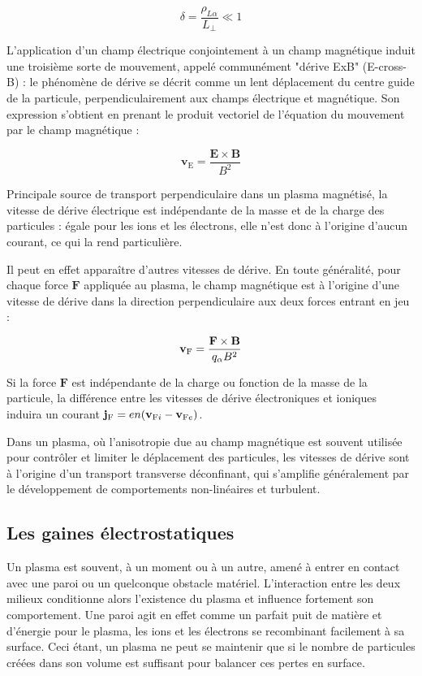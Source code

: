 \begin{refsection}
\begin{equation}
\delta=\frac{\rho_{L\alpha}}{L_\perp}\ll 1
\end{equation}

L'application d'un champ électrique conjointement à un champ magnétique
induit une troisième sorte de mouvement, appelé communément "dérive
ExB" (E-cross-B) : le phénomène de dérive se décrit comme un lent déplacement du
centre guide de la particule, perpendiculairement aux champs électrique et
magnétique. Son expression s'obtient en
prenant le produit vectoriel de l'équation du mouvement par le champ magnétique
:

\begin{equation}
\mathbf{v}_\text{E}=\frac{\mathbf{E}\times\mathbf{B}}{B^2}
\end{equation}

Principale source de transport perpendiculaire
dans un plasma magnétisé, la vitesse de dérive électrique est indépendante de
la masse et de la charge des particules : égale pour les ions et les électrons, elle n'est donc à
l'origine d'aucun courant, ce qui la rend particulière. 

Il peut en effet apparaître d'autres vitesses de dérive. En toute généralité, 
pour chaque force $\mathbf F$ appliquée au plasma, le champ magnétique est à
l'origine d'une vitesse de dérive dans la direction perpendiculaire aux deux
forces entrant en jeu :

\begin{equation}
\mathbf{v}{_{\text{F}}}=\frac{\mathbf{F}\times\mathbf{B}}{q_\alpha B^2}
\end{equation}

Si la force $\mathbf F$ est indépendante de la charge ou
fonction de la masse de la particule, la différence entre les vitesses de dérive
électroniques et ioniques induira un courant $\mathbf
j{_{\text{F}}}=en(\mathbf v{_{\text{F}{i}}}-\mathbf
v{_{\text{F}{e}}})$. 

Dans un plasma, où l'anisotropie due au champ
magnétique est souvent utilisée pour contrôler et limiter le déplacement des
particules, les vitesses de dérive sont à l'origine d'un transport
 transverse déconfinant, qui s'amplifie généralement par le développement de
 comportements non-linéaires et turbulent.
 
\subsection{Les gaines électrostatiques}
\label{1-gaines}
Un plasma est souvent, à un moment ou à un autre, amené à entrer en contact avec
une paroi ou un quelconque obstacle matériel. L'interaction entre
les deux milieux conditionne alors l'existence du plasma et influence
fortement son comportement. Une paroi agit en effet comme un parfait
puit de matière et d'énergie pour le plasma, les ions et les électrons se
recombinant facilement à sa surface. Ceci étant, un plasma ne peut se maintenir
que si le nombre de particules créées dans son volume est suffisant pour
balancer ces pertes en surface. 


\end{refsection}
